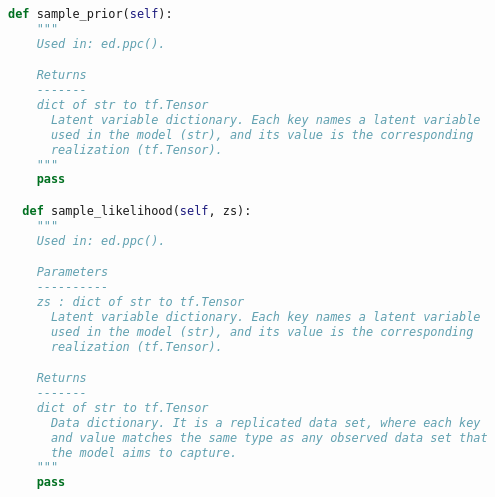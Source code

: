 \begin{lstlisting}[language=Python]
  def sample_prior(self):
    """
    Used in: ed.ppc().

    Returns
    -------
    dict of str to tf.Tensor
      Latent variable dictionary. Each key names a latent variable
      used in the model (str), and its value is the corresponding
      realization (tf.Tensor).
    """
    pass

  def sample_likelihood(self, zs):
    """
    Used in: ed.ppc().

    Parameters
    ----------
    zs : dict of str to tf.Tensor
      Latent variable dictionary. Each key names a latent variable
      used in the model (str), and its value is the corresponding
      realization (tf.Tensor).

    Returns
    -------
    dict of str to tf.Tensor
      Data dictionary. It is a replicated data set, where each key
      and value matches the same type as any observed data set that
      the model aims to capture.
    """
    pass
\end{lstlisting}
